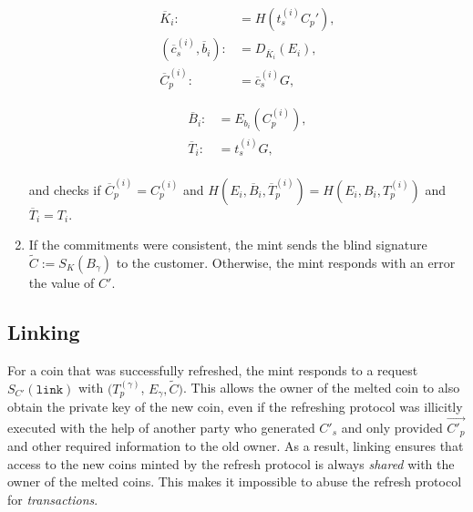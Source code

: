\documentclass{llncs}
\begin{document}
\begin{enumerate}
    \vspace{-2ex}
    \begin{minipage}{5cm}
    \begin{align*}
      \overline{K}_i :&= H(t_s^{(i)} C_p'), \\
      (\overline{c}_s^{(i)}, \overline{b}_i) :&= D_{\overline{K}_i}(E_i), \\
      \overline{C}^{(i)}_p :&= \overline{c}_s^{(i)} G,
     \end{align*}
     \end{minipage}
    \begin{minipage}{5cm}
      \begin{align*}
      \overline{B}_i :&= E_{b_i}(C_p^{(i)}), \\
      \overline{T}_i :&= t_s^{(i)} G, \\
      \end{align*}
    \end{minipage}

    and checks if $\overline{C}^{(i)}_p = C^{(i)}_p$ and $H(E_i, \overline{B}_i, \overline{T}^{(i)}_p) = H(E_i, B_i, T^{(i)}_p)$
    and $\overline{T}_i = T_i$.

  \item \label{step:refresh-done} If the commitments were consistent,
    the mint sends the blind signature $\widetilde{C} :=
    S_{K}(B_\gamma)$ to the customer.  Otherwise, the mint responds
    with an error the value of $C'$.
\end{enumerate}

%

\subsection{Linking}

For a coin that was successfully refreshed, the mint responds to a
request $S_{C'}(\mathtt{link})$ with $(T^{(\gamma)}_p$, $E_{\gamma},
\widetilde{C})$.
%
This allows the owner of the melted coin to also obtain the private
key of the new coin, even if the refreshing protocol was illicitly
executed with the help of another party who generated $C'_s$ and only
provided $\vec{C'_p}$ and other required information to the old owner.
As a result, linking ensures that access to the new coins minted by
the refresh protocol is always {\em shared} with the owner of the
melted coins.  This makes it impossible to abuse the refresh protocol
for {\em transactions}.
\end{document}
